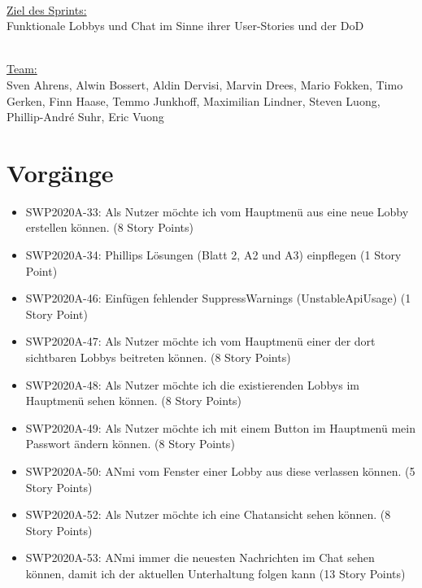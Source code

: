 \documentclass[12pt,a4paper, oneside]{article}
\begin{document}
    \noindent
    \\
    \underline{Ziel des Sprints:}
    \\
    Funktionale Lobbys und Chat im Sinne ihrer User-Stories und der DoD

    \noindent
    \\
    \underline {Team:}
    \\
    Sven Ahrens, Alwin Bossert, Aldin Dervisi, Marvin Drees, Mario Fokken,
    Timo Gerken, Finn Haase, Temmo Junkhoff, Maximilian Lindner, Steven Luong, Phillip-André Suhr, Eric Vuong


    \section{Vorgänge}

    \begin{itemize}
        \item SWP2020A-33: Als Nutzer möchte ich vom Hauptmenü aus eine neue Lobby erstellen können. (8 Story Points)

        \item SWP2020A-34: Phillips Lösungen (Blatt 2, A2 und A3) einpflegen (1 Story Point)

        \item SWP2020A-46: Einfügen fehlender SuppressWarnings (UnstableApiUsage) (1 Story Point)

        \item SWP2020A-47: Als Nutzer möchte ich vom Hauptmenü einer der dort sichtbaren Lobbys beitreten können. (8 Story Points)

        \item SWP2020A-48: Als Nutzer möchte ich die existierenden Lobbys im Hauptmenü sehen können. (8 Story Points)

        \item SWP2020A-49: Als Nutzer möchte ich mit einem Button im Hauptmenü mein Passwort ändern können. (8 Story Points)

        \item SWP2020A-50: ANmi vom Fenster einer Lobby aus diese verlassen können. (5 Story Points)

        \item SWP2020A-52: Als Nutzer möchte ich eine Chatansicht sehen können. (8 Story Points)

        \item SWP2020A-53: ANmi immer die neuesten Nachrichten im Chat sehen können, damit ich der aktuellen Unterhaltung folgen kann (13 Story Points)

    \end{itemize}
\end{document}
